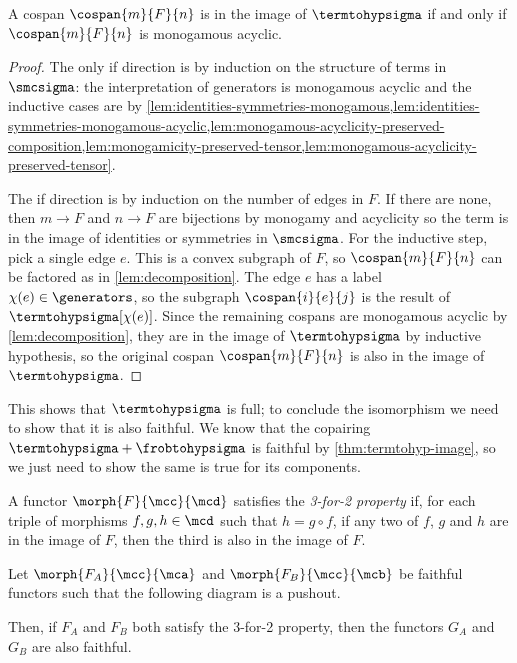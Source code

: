 \begin{theorem}\label{thm:monogamous-acyclic-full}
    A cospan \(\cospan{m}{F}{n}\) is in the image of
    \(\termtohypsigma\) if and only if \(\cospan{m}{F}{n}\)
    is monogamous acyclic.
\end{theorem}
\begin{proof}
    The only if direction is by induction on the structure of terms in
    \(\smcsigma\): the interpretation of generators is monogamous acyclic and
    the inductive cases are by
    \cref{lem:identities-symmetries-monogamous,lem:identities-symmetries-monogamous-acyclic,lem:monogamous-acyclicity-preserved-composition,lem:monogamicity-preserved-tensor,lem:monogamous-acyclicity-preserved-tensor}.

    The if direction is by induction on the number of edges in \(F\).
    If there are none, then \(m \to F\) and \(n \to F\) are
    bijections by monogamy and acyclicity so the term is in the image of
    identities or symmetries in \(\smcsigma\).
    For the inductive step, pick a single edge \(e\).
    This is a convex subgraph of \(F\), so
    \(\cospan{m}{F}{n}\) can be factored as in
    \cref{lem:decomposition}.
    The edge \(e\) has a label \(\chi(e) \in \generators\), so the subgraph
    \(\cospan{i}{e}{j}\) is the result of
    \(\termtohypsigma[\chi(e)]\).
    Since the remaining cospans are monogamous acyclic by
    \cref{lem:decomposition}, they are in the image of \(\termtohypsigma\) by
    inductive hypothesis, so the original cospan
    \(\cospan{m}{F}{n}\) is also in the image of
    \(\termtohypsigma\).
\end{proof}

This shows that \(\termtohypsigma\) is full; to conclude the isomorphism we
need to show that it is also faithful.
We know that the copairing \(\termtohypsigma + \frobtohypsigma\) is faithful
by \cref{thm:termtohyp-image}, so we just need to show the same is true for its
components.

\begin{definition}
    A functor \(\morph{F}{\mcc}{\mcd}\) satisfies the \emph{3-for-2 property}
    if, for each triple of morphisms \(f,g,h \in \mcd\) such that
    \(h = g \circ f\), if any two of \(f\), \(g\) and \(h\) are in the image of
    \(F\), then the third is also in the image of \(F\).
\end{definition}

\begin{theorem}
    \label{thm:faithful-pushout}
    Let \(\morph{F_A}{\mcc}{\mca}\) and \(\morph{F_B}{\mcc}{\mcb}\) be faithful
    functors such that the following diagram is a pushout.
    \begin{center}
        
    \end{center}
    Then, if \(F_A\) and \(F_B\) both satisfy the 3-for-2 property, then the
    functors \(G_A\) and \(G_B\) are also faithful.
\end{theorem}

